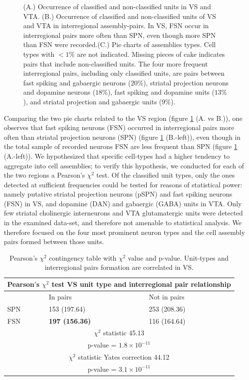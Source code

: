 \begin{figure}[H]
    \caption{(A.) Occurrence of classified and non-classified units in VS and VTA. (B.) Occurrence of classified and non-classified units of VS and VTA in interregional assembly-pairs. In VS, FSN occur in interregional pairs more often than SPN, even though more SPN than FSN were recorded.(C.) Pie charts of assemblies types. Cell types with $<1\%$ are not indicated. Missing pieces of cake indicates pairs that include non-classified units. The four more frequent interregional pairs, including only classified units, are pairs between fast spiking and gabaergic neurons ($20\%$), striatal projection neurons and dopamine neurons ($18\%$), fast spiking and dopamine units ($13\%$), and striatal projection and gabaergic units ($9\%$). }
    \label{fig:PieAssembliesTot}
\end{figure}
Comparing the two pie charts related to the VS region (figure \ref{fig:PieAssembliesTot} (A. vs B.)), one observes that fast spiking neurons (FSN) occurred in interregional pairs more often than striatal projection neurons (SPN) (figure \ref{fig:PieAssembliesTot} (B.-left)), even though in the total sample of recorded neurons FSN are less frequent than SPN (figure \ref{fig:PieAssembliesTot} (A.-left)).
\label{sec:CellTypesOcc}
We hypothesized that specific cell-types had a higher tendency to aggregate into cell assemblies; to verify this hypothesis, we conducted for each of the two regions a Pearson's $\chi^2$ test. Of the classified unit types, only the ones detected at sufficient frequencies could be tested for reasons of statistical power: namely putative striatal projection neurons (pSPN) and fast spiking neurons (FSN) in VS, and dopamine (DAN) and gabaergic (GABA) units in VTA. Only few striatal cholinergic interneurons and VTA glutamatergic units were detected in the examined data-set, and therefore not amenable to statistical analysis. We therefore focused on the four most prominent neuron types and the cell assembly pairs formed between those units.
\begin{table}[H]
\begin{tabular}{ |p{3cm}|p{3cm}|p{3cm}| }
 \hline
 \multicolumn{3}{|c|}{Pearson$'$s $\chi^2$ test VS unit type and interregional pair relationship} \\
 \hline
 & In pairs & Not in pairs\\
 \hline
 SPN & 153 (197.64) & 253 (208.36) \\
 \hline
 FSN & \textbf{197 (156.36)} & 116 (164.64)\\
 \hline
 \multicolumn{3}{|c|}{$\chi^2$ statistic  45.13}\\
 \multicolumn{3}{|c|}{p-value = $1.8\times10^{-11}$}\\
 \hline
 \multicolumn{3}{|c|}{$\chi^2$ statistic Yates correction 44.12}\\
 \multicolumn{3}{|c|}{p-value = $3.1\times10^{-11}$}\\
 \hline
\end{tabular}
\caption{Pearson's $\chi^2$ contingency table with $\chi^2$ value and p-value. Unit-types and interregional pairs formation are correlated in VS.}
\label{tab:chi2_asnotasVS}
\end{table}
